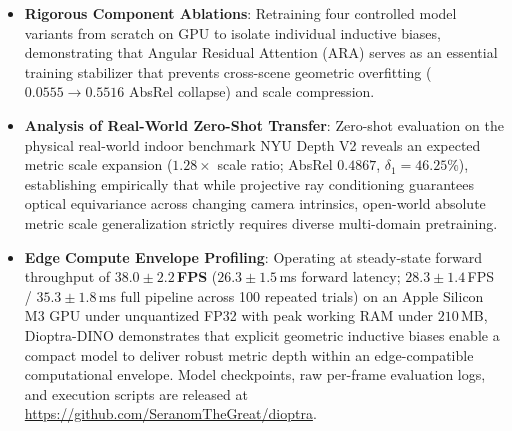 \begin{itemize}
    \item \textbf{Rigorous Component Ablations}: Retraining four controlled model variants from scratch on GPU to isolate individual inductive biases, demonstrating that Angular Residual Attention (ARA) serves as an essential training stabilizer that prevents cross-scene geometric overfitting ($0.0555 \to 0.5516$ AbsRel collapse) and scale compression.
    \item \textbf{Analysis of Real-World Zero-Shot Transfer}: Zero-shot evaluation on the physical real-world indoor benchmark NYU Depth V2 reveals an expected metric scale expansion ($1.28\times$ scale ratio; AbsRel $0.4867$, $\delta_1 = 46.25\%$), establishing empirically that while projective ray conditioning guarantees optical equivariance across changing camera intrinsics, open-world absolute metric scale generalization strictly requires diverse multi-domain pretraining.
    \item \textbf{Edge Compute Envelope Profiling}: Operating at steady-state forward throughput of \textbf{$38.0 \pm 2.2$\,FPS} ($26.3 \pm 1.5$\,ms forward latency; $28.3 \pm 1.4$\,FPS / $35.3 \pm 1.8$\,ms full pipeline across 100 repeated trials) on an Apple Silicon M3 GPU under unquantized FP32 with peak working RAM under $210$\,MB, Dioptra-DINO demonstrates that explicit geometric inductive biases enable a compact model to deliver robust metric depth within an edge-compatible computational envelope. Model checkpoints, raw per-frame evaluation logs, and execution scripts are released at \url{https://github.com/SeranomTheGreat/dioptra}.
\end{itemize}

